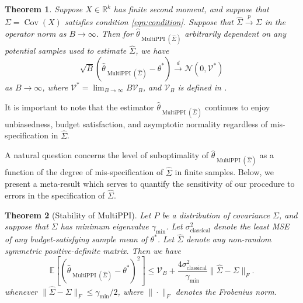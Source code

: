 \documentclass{article} %
\newcommand{\R}{\mathbb{R}}
\newcommand{\Ex}{\mathbb{E}}
\DeclareMathOperator{\Cov}{Cov}
\DeclareMathOperator{\multiPPI}{MultiPPI}
\newtheorem{theorem}{Theorem}
\newcommand{\wh}[1]{\widehat{#1}}
\DeclareMathOperator{\classical}{classical}
\begin{document}
\begin{theorem}\label{thm:asymptotic_revised}
Suppose $X\in\R^k$ has finite second moment, and suppose that $\Sigma=\Cov(X)$ satisfies condition \ref{eqn:condition}. Suppose that $\wh{\Sigma}\overset{p}{\to}\Sigma$ in the operator norm as $B\to\infty$. Then for $\hat{\theta}_{\multiPPI(\widehat{\Sigma})}$ arbitrarily dependent on any potential samples used to estimate $\widehat{\Sigma}$, we have
    \[
    \sqrt{B}\left(\hat{\theta}_{\multiPPI(\widehat{\Sigma})}-\theta^*\right)\overset{d}{\to}\mathcal{N}(0,\mathcal{V}^*)
    \]
    as $B\to\infty$, where $\mathcal{V}^*=\lim_{B\to\infty} B\mathcal{V}_{B}$, and $\mathcal{V}_{B}$ is defined in .
\end{theorem}
It is important to note that the estimator $\hat{\theta}_{\multiPPI(\wh{\Sigma})}$ continues to enjoy unbiasedness, budget satisfaction, and asymptotic normality regardless of mis-specification in $\wh{\Sigma}$. 



A natural question concerns the level of suboptimality of $\hat{\theta}_{\multiPPI(\wh{\Sigma})}$ as a function of the degree of mis-specification of $\wh{\Sigma}$ in finite samples. Below, we present a meta-result which serves to quantify the sensitivity of our procedure to errors in the specification of $\wh{\Sigma}$.

\begin{theorem}[Stability of MultiPPI]\label{thm:stab}
    Let $P$ be a distribution of covariance $\Sigma$, and suppose that $\Sigma$ has minimum eigenvalue $\gamma_{\min}$. Let $\sigma^2_{\classical}$ denote the least MSE of any budget-satisfying sample mean of $\theta^*$. Let $\widehat{\Sigma}$ denote any non-random symmetric positive-definite matrix. Then we have
    \[
    \Ex\left[\left(\hat{\theta}_{\multiPPI(\widehat{\Sigma})}-\theta^*\right)^2\right] \leq \mathcal{V}_B + \frac{4\sigma^2_{\classical}}{\gamma_{\min}}\|\wh{\Sigma}-\Sigma\|_{F}.
    \]
    whenever $\|\wh{\Sigma}-\Sigma\|_{F}\leq \gamma_{\min}/2$, where $\|\cdot\|_F$ denotes the Frobenius norm.
\end{theorem}
\end{document}
